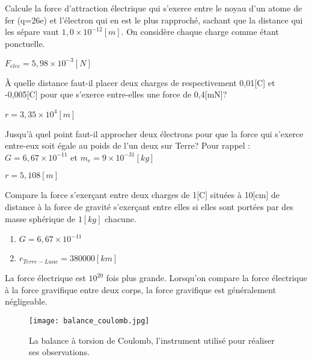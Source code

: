 \begin{exercise}
    Calcule la force d'attraction électrique qui s'exerce entre le noyau d'un atome de fer (q=26e) et l'électron qui en est le plus rapproché, sachant que la distance qui les sépare vaut \(1,0 \times 10^{-12}[m]\). On considère chaque charge comme étant ponctuelle.
\end{exercise}
\begin{solution}
    \(F_{elec}=5,98 \times 10^{-3}[N]\)
\end{solution}

\begin{exercise}
    À quelle distance faut-il placer deux charges de respectivement 0,01[C] et -0,005[C] pour que s'exerce entre-elles une force de 0,4[mN]?
\end{exercise}
\begin{solution}
    \(r=3,35 \times 10^4 [m]\)
\end{solution}

\begin{exercise}
    Jusqu'à quel point faut-il approcher deux électrons pour que la force qui s'exerce entre-eux soit égale au poids de l'un deux sur Terre?
    Pour rappel : \(G=6,67 \times 10^{-11}\) et \(m_e=9 \times 10^{-31} [kg]\)
\end{exercise}
\begin{solution}
    \(r=5,108[m]\)
\end{solution}


\begin{exercise}
    Compare la force s'exerçant entre deux charges de 1[C] situées à 10[cm] de distance à la force de gravité s'exerçant entre elles si elles sont portées par des masse sphérique de \(1 [kg]\) chacune.
    \begin{enumerate}[label=\textbullet]
        \item \(G=6,67 \times 10^{-11}\)
        \item \(r_{Terre-Lune}=380000[km]\)
    \end{enumerate}
\end{exercise}
\begin{solution}
    La force électrique est \(10^20\) fois plus grande. Lorsqu'on compare la force électrique à la force gravifique entre deux corps, la force gravifique est généralement négligeable.
\end{solution}

\begin{figure}[h!]
    \centering
    \texttt{[image: balance\_coulomb.jpg]}
    \caption{La balance à torsion de Coulomb, l'instrument utilisé pour réaliser ses observations.}
    \label{balance_coulomb}
\end{figure}
